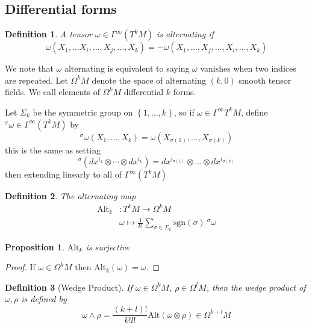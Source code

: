 \documentclass[a4paper]{article}
\newtheorem*{prop}{Proposition}
\newtheorem*{defn}{Definition}
\begin{document}
\subsection*{Differential forms}%
\begin{defn}
  A tensor $\omega \in \Gamma^\infty(T^kM)$ is alternating if 
\[
  \omega(X_1, \dots X_i, \dots, X_j, \dots, X_k) = -\omega(X_1, \dots, X_j, \dots, X_i, \dots, X_k) 
\]
\end{defn}
We note that $\omega$ alternating is equivalent to saying $\omega$ vanishes when two indices are repeated. Let $\Omega^kM$ denote the space of alternating $(k,0)$ smooth tensor fields. We call elements of $\Omega^kM$ differential $k$ forms.

Let $\Sigma_k$ be the symmetric group on $\left\{ 1, \dots, k \right\}$, so if $ \omega \in \Gamma^\infty T^kM$, define $^\sigma \omega \in \Gamma^{\infty} (T^kM)$ by
\[
  ^\sigma \omega(X_1, \dots, X_k) = \omega (X_{\sigma(1)}, \dots, X_{\sigma(k)})
\]
this is the same as setting
\[
  ^\sigma \left( dx^{i_1} \otimes \cdots \otimes dx^{i_k} \right) = dx^{i_{\sigma(1)}} \otimes \dots \otimes dx^{i_{\sigma(k)}}
\]
then extending linearly to all of $\Gamma^\infty (T^kM)$

\begin{defn}
  The alternating map 
  \[
    \begin{aligned}
      \text{Alt}_k&: T^k M \rightarrow \Omega^k M \\
                  &\omega \mapsto \frac{1}{k!} \sum_{\sigma \in \Sigma_k} \text{sgn}(\sigma)\ ^\sigma\omega
    \end{aligned}
  \]
\end{defn}

\begin{prop}
  $\text{Alt}_k$ is surjective
\end{prop}
\begin{proof}
  If $\omega \in \Omega^k M$ then $\text{Alt}_k (\omega) = \omega$.
\end{proof}

\begin{defn}[Wedge Product]
  If $\omega \in \Omega^kM$, $\rho \in \Omega^lM$, then the wedge product of $\omega, \rho$ is defined by
  \[
    \omega \wedge \rho = \frac{(k+l)!}{k!l!} \text{Alt}(\omega \otimes \rho) \in \Omega^{k+l}M
  \]
\end{defn}
\end{document}
